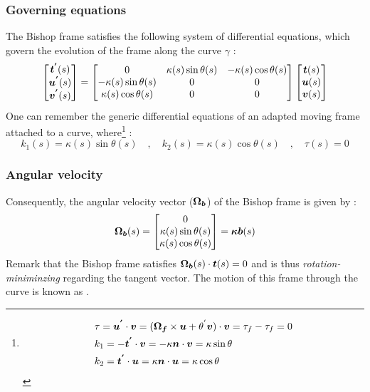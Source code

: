 \subsubsection{Governing equations}
The Bishop frame satisfies the following system of differential equations, which govern the evolution of the frame along the curve $\gamma$ :
\begin{equation}
	\begin{bmatrix}
		\boldsymbol{t^{'}}(s) \\
		\boldsymbol{u^{'}}(s) \\
		\boldsymbol{v^{'}}(s)
	\end{bmatrix}
	=
	\begin{bmatrix}
		0 & \kappa(s) \sin \theta(s) & -\kappa(s) \cos \theta(s) \\
		-\kappa(s) \sin \theta(s) & 0 & 0 \\
		\kappa(s) \cos \theta(s) & 0 & 0
	\end{bmatrix}
	\begin{bmatrix}
		\boldsymbol{t}(s) \\
		\boldsymbol{u}(s) \\
		\boldsymbol{v}(s)
	\end{bmatrix}
\label{eq:3_12}
\end{equation}
One can remember the generic differential equations of an adapted moving frame attached to a curve, where\footnote{
\begin{equation}
	\begin{aligned}
		&\tau =\boldsymbol{u^{'}} \cdot \boldsymbol{v} = (\boldsymbol{\Omega_f} \times \boldsymbol{u} + \theta^{'} \boldsymbol{v})\cdot  \boldsymbol{v} = \tau_f - \tau_f = 0\\
		&k_1 = -\boldsymbol{t^{'}} \cdot \boldsymbol{v} = -\kappa \boldsymbol{n} \cdot \boldsymbol{v} = \kappa \sin \theta \\
		&k_2 = \boldsymbol{t^{'}} \cdot \boldsymbol{u} = \kappa \boldsymbol{n} \cdot \boldsymbol{u} = \kappa \cos \theta
	\end{aligned}
\end{equation}
} :
\begin{equation}
k_{1}(s) = \kappa(s) \sin \theta(s)
\quad,\quad
k_{2}(s) = \kappa(s) \cos \theta(s)
\quad,\quad
\tau(s) = 0
\end{equation}

\subsubsection{Angular velocity}\label{sec:bishopvelocity}
Consequently, the angular velocity vector ($\boldsymbol{\Omega_{b}}$) of the Bishop frame is given by :
\begin{equation}
	\boldsymbol{\Omega_b}(s) 
	=
	\begin{bmatrix}
		0\\
		\kappa(s) \sin \theta(s)\\
		\kappa(s) \cos \theta(s)
	\end{bmatrix}
	= \boldsymbol{\kappa b}(s) 
\end{equation}
Remark that the Bishop frame satisfies $\boldsymbol{\Omega_b}(s) \cdot \boldsymbol{t}(s) = 0$ and is thus \emph{rotation-miniminzing} regarding the tangent vector. The motion of this frame through the curve is known as .

